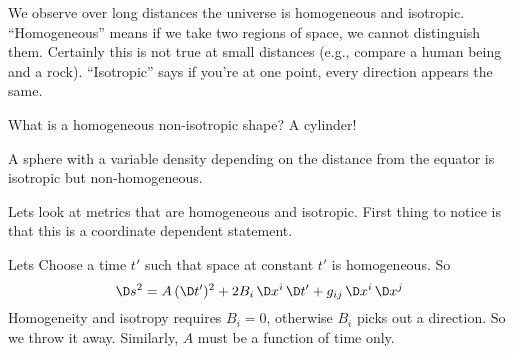 
We observe over long distances the universe is homogeneous and
isotropic. ``Homogeneous'' means if we take two regions of space,
we cannot distinguish them. Certainly this is not true at small
distances (e.g., compare a human being and a rock). ``Isotropic''
says if you're at one point, every direction appears the same.

What is a homogeneous non-isotropic shape? A cylinder!

A sphere with a variable density depending on the distance from
the equator is isotropic but non-homogeneous.

Lets look at metrics that are homogeneous and isotropic. First
thing to notice is that this is a coordinate dependent statement.

Lets Choose a time $t'$ such that space at constant $t'$ is
homogeneous. So
\begin{equation}
\D s^{2}=A\,(\D t')^{2} + 2B_{i}\,\D x^{i}\,\D t' + g_{ij}\,\D
x^{i}\,\D x^{j}
\end{equation}
Homogeneity and isotropy requires $B_{i}=0$, otherwise $B_{i}$
picks out a direction. So we throw it away. Similarly, $A$ must
be a function of time only.

